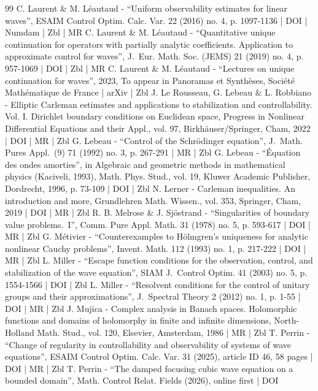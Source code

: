 \documentclass[10pt]{amsart}
\theoremstyle{definition}
\begin{document}
\begin{thebibliography}{99}
C. Laurent \& M. Léautaud - “Uniform observability estimates for linear waves”, ESAIM Control Optim. Calc. Var. 22 (2016) no. 4, p. 1097-1136 | DOI | Numdam | Zbl | MR
C. Laurent \& M. Léautaud - “Quantitative unique continuation for operators with partially analytic coefficients. Application to approximate control for waves”, J. Eur. Math. Soc. (JEMS) 21 (2019) no. 4, p. 957-1069 | DOI | Zbl | MR
C. Laurent \& M. Léautaud - “Lectures on unique continuation for waves”, 2023, To appear in Panoramas et Synthèses, Société Mathématique de France | arXiv | Zbl
J. Le Rousseau, G. Lebeau \& L. Robbiano - Elliptic Carleman estimates and applications to stabilization and controllability. Vol. I. Dirichlet boundary conditions on Euclidean space, Progress in Nonlinear Differential Equations and their Appl., vol. 97, Birkhäuser/Springer, Cham, 2022 | DOI | MR | Zbl
G. Lebeau - “Control of the Schrödinger equation”, J. Math. Pures Appl. (9) 71 (1992) no. 3, p. 267-291 | MR | Zbl
G. Lebeau - “Équation des ondes amorties”, in Algebraic and geometric methods in mathematical physics (Kaciveli, 1993), Math. Phys. Stud., vol. 19, Kluwer Academic Publisher, Dordrecht, 1996, p. 73-109 | DOI | Zbl
N. Lerner - Carleman inequalities. An introduction and more, Grundlehren Math. Wissen., vol. 353, Springer, Cham, 2019 | DOI | MR | Zbl
R. B. Melrose \& J. Sjöstrand - “Singularities of boundary value problems. I”, Comm. Pure Appl. Math. 31 (1978) no. 5, p. 593-617 | DOI | MR | Zbl
G. Métivier - “Counterexamples to Hölmgren’s uniqueness for analytic nonlinear Cauchy problems”, Invent. Math. 112 (1993) no. 1, p. 217-222 | DOI | MR | Zbl
L. Miller - “Escape function conditions for the observation, control, and stabilization of the wave equation”, SIAM J. Control Optim. 41 (2003) no. 5, p. 1554-1566 | DOI | Zbl
L. Miller - “Resolvent conditions for the control of unitary groups and their approximations”, J. Spectral Theory 2 (2012) no. 1, p. 1-55 | DOI | MR | Zbl
J. Mujica - Complex analysis in Banach spaces. Holomorphic functions and domains of holomorphy in finite and infinite dimensions, North-Holland Math. Stud., vol. 120, Elsevier, Amsterdam, 1986 | MR | Zbl
T. Perrin - “Change of regularity in controllability and observability of systems of wave equations”, ESAIM Control Optim. Calc. Var. 31 (2025), article ID 46, 58 pages | DOI | MR | Zbl
T. Perrin - “The damped focusing cubic wave equation on a bounded domain”, Math. Control Relat. Fields (2026), online first | DOI

\end{thebibliography}
\end{document}
